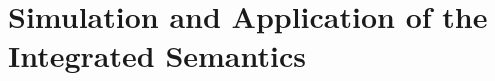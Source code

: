 \documentclass[conference]{IEEEtran}
\begin{document}
\section{Simulation and Application of the Integrated Semantics}
\end{document}
